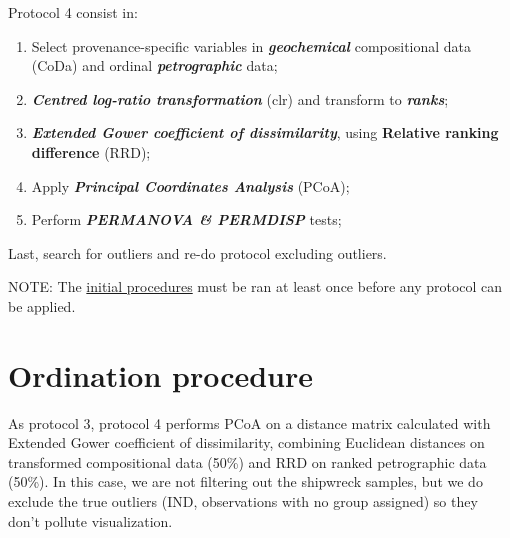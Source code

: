 \documentclass[12pt,]{book}
\providecommand{\tightlist}{%
  \setlength{\itemsep}{0pt}\setlength{\parskip}{0pt}}
\begin{document}
Protocol 4 consist in:

\begin{enumerate}
\def\labelenumi{\arabic{enumi}.}
\tightlist
\item
  Select provenance-specific variables in \textbf{\emph{geochemical}} compositional data (CoDa) and ordinal \textbf{\emph{petrographic}} data;
\item
  \textbf{\emph{Centred log-ratio transformation}} (clr) and transform to \textbf{\emph{ranks}};
\item
  \textbf{\emph{Extended Gower coefficient of dissimilarity}}, using \textbf{Relative ranking difference} (RRD);
\item
  Apply \textbf{\emph{Principal Coordinates Analysis}} (PCoA);
\item
  Perform \textbf{\emph{PERMANOVA \& PERMDISP}} tests;
\end{enumerate}

Last, search for outliers and re-do protocol excluding outliers.

NOTE: The \protect\hyperlink{init}{initial procedures} must be ran at least once before any protocol can be applied.

\hypertarget{ordination-procedure-4}{%
\section{Ordination procedure}\label{ordination-procedure-4}}

As protocol 3, protocol 4 performs PCoA on a distance matrix calculated with Extended Gower coefficient of dissimilarity, combining Euclidean distances on transformed compositional data (50\%) and RRD on ranked petrographic data (50\%). In this case, we are not filtering out the shipwreck samples, but we do exclude the true outliers (IND, observations with no group assigned) so they don't pollute visualization.
\end{document}
